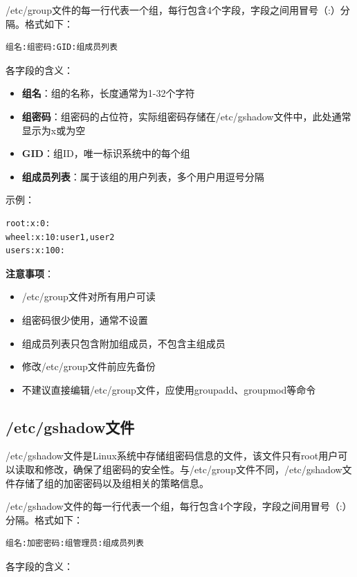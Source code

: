 \documentclass[12pt,UTF8]{ctexbook}
\begin{document}
/etc/group文件的每一行代表一个组，每行包含4个字段，字段之间用冒号（:）分隔。格式如下：

\begin{verbatim}
组名:组密码:GID:组成员列表
\end{verbatim}

各字段的含义：

\begin{itemize}
    \item \textbf{组名}：组的名称，长度通常为1-32个字符
    \item \textbf{组密码}：组密码的占位符，实际组密码存储在/etc/gshadow文件中，此处通常显示为x或为空
    \item \textbf{GID}：组ID，唯一标识系统中的每个组
    \item \textbf{组成员列表}：属于该组的用户列表，多个用户用逗号分隔
\end{itemize}

示例：

\begin{verbatim}
root:x:0:
wheel:x:10:user1,user2
users:x:100:
\end{verbatim}

\textbf{注意事项}：
\begin{itemize}
    \item /etc/group文件对所有用户可读
    \item 组密码很少使用，通常不设置
    \item 组成员列表只包含附加组成员，不包含主组成员
    \item 修改/etc/group文件前应先备份
    \item 不建议直接编辑/etc/group文件，应使用groupadd、groupmod等命令
\end{itemize}

\subsection{/etc/gshadow文件}

/etc/gshadow文件是Linux系统中存储组密码信息的文件，该文件只有root用户可以读取和修改，确保了组密码的安全性。与/etc/group文件不同，/etc/gshadow文件存储了组的加密密码以及组相关的策略信息。

/etc/gshadow文件的每一行代表一个组，每行包含4个字段，字段之间用冒号（:）分隔。格式如下：

\begin{verbatim}
组名:加密密码:组管理员:组成员列表
\end{verbatim}

各字段的含义：
\end{document}
